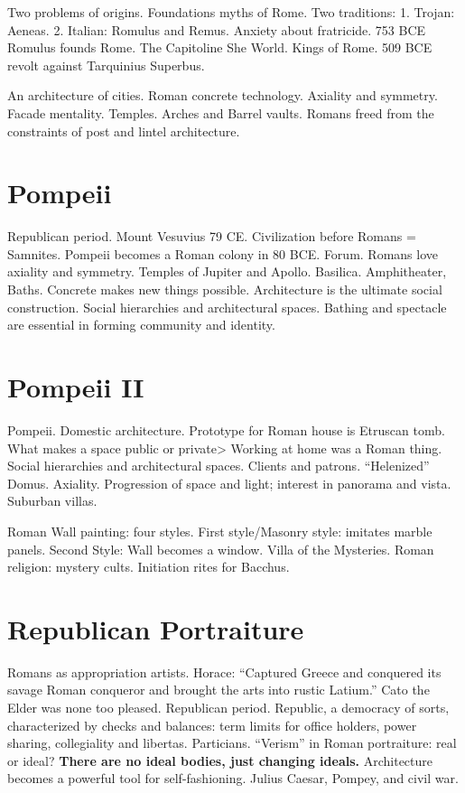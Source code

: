 \documentclass[10pt]{armath}
\begin{document}
\begin{multicols}{2}
Two problems of origins. Foundations myths of Rome. Two traditions: 1. Trojan:
Aeneas. 2. Italian: Romulus and Remus. Anxiety about fratricide. 753 BCE
Romulus founds Rome. The Capitoline She World. Kings of Rome. 509 BCE revolt
against Tarquinius Superbus.

An architecture of cities. Roman concrete technology. Axiality and symmetry.
Facade mentality. Temples. Arches and Barrel vaults. Romans freed from the
constraints of post and lintel architecture.

\section{Pompeii}%
\label{sec:pompeii}

Republican period. Mount Vesuvius 79 CE. Civilization before Romans = Samnites.
Pompeii becomes a Roman colony in 80 BCE. Forum. Romans love axiality and
symmetry. Temples of Jupiter and Apollo. Basilica. Amphitheater, Baths.
Concrete makes new things possible. Architecture is the ultimate social
construction. Social hierarchies and architectural spaces. Bathing and
spectacle are essential in forming community and identity.

\section{Pompeii II}%
\label{sec:pompeii_ii}

Pompeii. Domestic architecture. Prototype for Roman house is Etruscan tomb.
What makes a space public or private> Working at home was a Roman thing. Social
hierarchies and architectural spaces. Clients and patrons. ``Helenized''
Domus. Axiality. Progression of space and light; interest in panorama and vista.
Suburban villas.

Roman Wall painting: four styles. First style/Masonry style: imitates marble
panels. Second Style: Wall becomes a window. Villa of the Mysteries. Roman
religion: mystery cults. Initiation rites for Bacchus.

\section{Republican Portraiture}%
\label{sec:republican_portraiture}

Romans as appropriation artists. Horace: ``Captured Greece and conquered its
savage Roman conqueror and brought the arts into rustic Latium.'' Cato the Elder
was none too pleased. Republican period. Republic, a democracy of sorts,
characterized by checks and balances: term limits for office holders, power
sharing, collegiality and libertas. Particians. ``Verism'' in Roman
portraiture: real or ideal? \textbf{There are no ideal bodies, just changing
ideals.} Architecture becomes a powerful tool for self-fashioning. Julius
Caesar, Pompey, and civil war.


\end{multicols}
\end{document}
